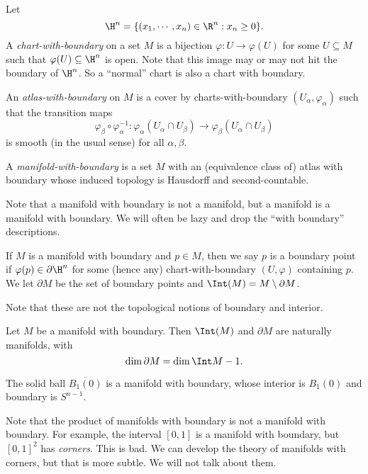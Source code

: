 \documentclass[a4paper]{article}
\begin{document}
\begin{defi}
  Let
  \[
    \H^n = \{(x_1, \cdots, x_n)\in \R^n: x_n \geq 0\}.
  \]
  A \emph{chart-with-boundary} on a set $M$ is a bijection $\varphi: U \to \varphi(U)$ for some $U \subseteq M$ such that $\varphi(U) \subseteq \H^n$ is open. Note that this image may or may not hit the boundary of $\H^n$. So a ``normal'' chart is also a chart with boundary.

  An \emph{atlas-with-boundary} on $M$ is a cover by charts-with-boundary $(U_\alpha, \varphi_\alpha)$ such that the transition maps
  \[
    \varphi_\beta \circ \varphi_\alpha^{-1}: \varphi_\alpha(U_\alpha \cap U_\beta) \to \varphi_\beta(U_\alpha \cap U_\beta)
  \]
  is smooth (in the usual sense) for all $\alpha, \beta$.

  A \emph{manifold-with-boundary} is a set $M$ with an (equivalence class of) atlas with boundary whose induced topology is Hausdorff and second-countable.
\end{defi}

Note that a manifold with boundary is not a manifold, but a manifold is a manifold with boundary. We will often be lazy and drop the ``with boundary'' descriptions.

\begin{defi}
  If $M$ is a manifold with boundary and $p \in M$, then we say $p$ is a boundary point if $\varphi(p) \in \partial \H^n$ for some (hence any) chart-with-boundary $(U, \varphi)$ containing $p$. We let $\partial M$ be the set of boundary points and $\Int(M) = M \setminus \partial M$.
\end{defi}

Note that these are not the topological notions of boundary and interior.

\begin{prop}
  Let $M$ be a manifold with boundary. Then $\Int(M)$ and $\partial M$ are naturally manifolds, with
  \[
    \dim \partial M = \dim \Int M - 1.
  \]
\end{prop}

\begin{eg}
  The solid ball $\overline{B_1(0)}$ is a manifold with boundary, whose interior is $B_1(0)$ and boundary is $S^{n - 1}$.
\end{eg}

Note that the product of manifolds with boundary is not a manifold with boundary. For example, the interval $[0, 1]$ is a manifold with boundary, but $[0, 1]^2$ has \emph{corners}. This is bad. We can develop the theory of manifolds with corners, but that is more subtle. We will not talk about them.
\end{document}
